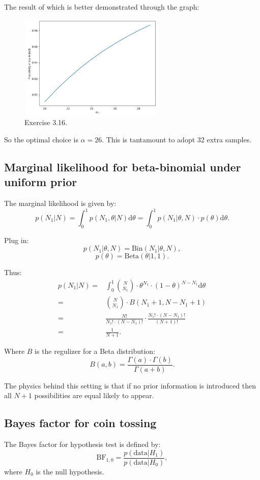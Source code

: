 \documentclass[UTF8]{ctexart}
\begin{document}
The result of which is better demonstrated through the graph:
\begin{figure}[htbp]
\centering
\includegraphics[width=7cm,height=5cm]{./figures/3-16.png}
\caption{Exercise 3.16.}
\end{figure}
So the optimal choice is $\alpha=26$.
This is tantamount to adopt 32 extra samples. 

\subsection{Marginal likelihood for beta-binomial under uniform prior}
The marginal likelihood is given by:
$$p(N_{1}|N)=\int_{0}^{1} p(N_{1},\theta|N) \text{d}\theta = \int_{0}^{1} p(N_{1}|\theta,N)\cdot p(\theta)\text{d}\theta.$$

Plug in:
$$p(N_{1}|\theta,N)=\text{Bin}(N_{1}|\theta,N),$$
$$p(\theta) = \text{Beta}(\theta|1,1).$$

Thus:
\begin{align}
p(N_{1}|N)=&\int_{0}^{1} \binom{N}{N_{1}}\cdot \theta^{N_{1}}\cdot (1-\theta)^{N-N_{1}} \text{d}\theta \nonumber \\
=&\binom{N}{N_{1}}\cdot B(N_{1} +1,N-N_{1}+1)\nonumber \\
=&\frac{N!}{N_{1}!\cdot (N-N_{1})!}\cdot\frac{N_{1}! \cdot(N-N_{1})!}{(N+1)!}\nonumber \\
=&\frac{1}{N+1}. \nonumber
\end{align}

Where $B$ is the regulizer for a Beta distribution:
$$B(a,b)=\frac{\Gamma(a)\cdot\Gamma(b)}{\Gamma(a+b)}.$$

The physics behind this setting is that if no prior information is introduced then all $N+1$ possibilities are equal likely to appear.

\subsection{Bayes factor for coin tossing}
The Bayes factor for hypothesis test is defined by:
$$\text{BF}_{1,0}=\frac{p(\text{data}|H_{1})}{p(\text{data}|H_{0})},$$
where $H_{0}$ is the null hypothesis. 
\end{document}
